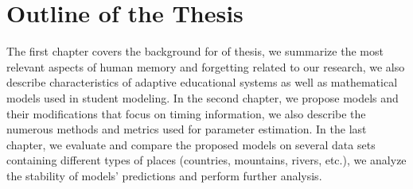 \section{Outline of the Thesis}

The first chapter covers the background for of thesis, we summarize the most relevant aspects of human memory and forgetting related to our research, we also describe characteristics of adaptive educational systems as well as mathematical models used in student modeling. In the second chapter, we propose models and their modifications that focus on timing information, we also describe the numerous methods and metrics used for parameter estimation. In the last chapter, we evaluate and compare the proposed models on several data sets containing different types of places (countries, mountains, rivers, etc.), we analyze the stability of models' predictions and perform further analysis.
